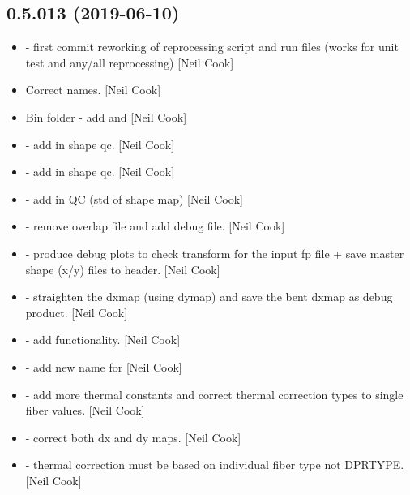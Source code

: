 \documentclass[a4paper,10pt,english]{report}
\begin{document}
\subsection{0.5.013 (2019-06-10)}
\label{\detokenize{misc/changelog:id124}}\begin{itemize}
\item {} 
 - first commit reworking of reprocessing script and
run files (works for unit test and any/all reprocessing) {[}Neil Cook{]}

\item {} 
Correct names. {[}Neil Cook{]}

\item {} 
Bin folder - add  and  {[}Neil Cook{]}

\item {} 
 - add in shape qc. {[}Neil Cook{]}

\item {} 
 - add in shape qc. {[}Neil Cook{]}

\item {} 
 - add in QC (std of shape map) {[}Neil Cook{]}

\item {} 
 - remove overlap file and add 
debug file. {[}Neil Cook{]}

\item {} 
 - produce debug plots to check transform for the
input fp file + save master shape (x/y) files to header. {[}Neil Cook{]}

\item {} 
 - straighten the dxmap (using dymap) and
save the bent dxmap as debug product. {[}Neil Cook{]}

\item {} 
 - add  functionality. {[}Neil Cook{]}

\item {} 
 - add new name for 
 {[}Neil Cook{]}

\item {} 
 - add more thermal constants and correct
thermal correction types to single fiber values. {[}Neil Cook{]}

\item {} 
 - correct both dx and dy maps. {[}Neil Cook{]}

\item {} 
 - thermal correction must be based on
individual fiber type not DPRTYPE. {[}Neil Cook{]}

\end{itemize}
\end{document}

